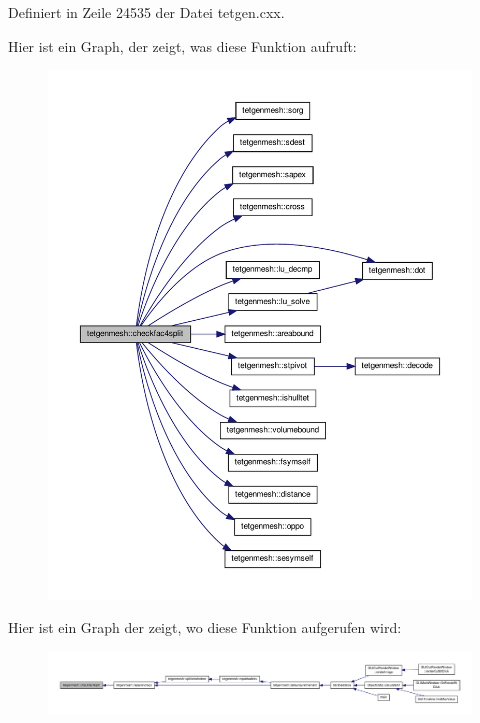 Definiert in Zeile 24535 der Datei tetgen.\-cxx.



Hier ist ein Graph, der zeigt, was diese Funktion aufruft\-:
\nopagebreak
\begin{figure}[H]
\begin{center}
\leavevmode
\includegraphics[width=350pt]{classtetgenmesh_aa70e994f2091786686a9336461e5d94d_cgraph}
\end{center}
\end{figure}




Hier ist ein Graph der zeigt, wo diese Funktion aufgerufen wird\-:
\nopagebreak
\begin{figure}[H]
\begin{center}
\leavevmode
\includegraphics[width=350pt]{classtetgenmesh_aa70e994f2091786686a9336461e5d94d_icgraph}
\end{center}
\end{figure}



